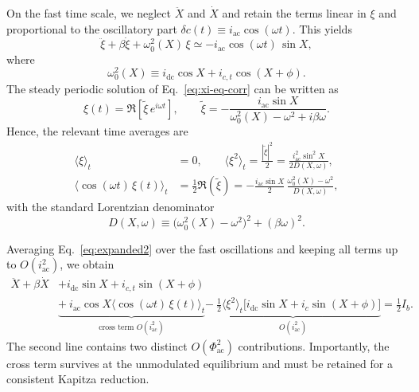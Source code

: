 \documentclass[prl,twocolumn,superscriptaddress,showpacs,nofootinbib]{revtex4-2}
\begin{document}
On the fast time scale, we neglect $\ddot X$ and $\dot X$ and retain the terms
linear in $\xi$ and proportional to the oscillatory part
$\delta c(t)\equiv i_{\mathrm{ac}}\cos(\omega t)$. This yields
\begin{equation}
\ddot \xi + \beta \dot \xi + \omega_0^2(X)\,\xi
\simeq
-i_{\mathrm{ac}}\cos(\omega t)\,\sin X,
\label{eq:xi-eq-corr}
\end{equation}
where
\begin{equation}
\omega_0^2(X)\equiv i_{\mathrm{dc}}\cos X + i_{c,t}\cos(X+\phi).
\label{eq:omega0}
\end{equation}
The steady periodic solution of Eq.~\eqref{eq:xi-eq-corr} can be written as
\begin{equation}
\xi(t)=\Re\!\left[\tilde\xi\,e^{i\omega t}\right],
\qquad
\tilde\xi=
-\frac{i_{\mathrm{ac}}\sin X}{\omega_0^2(X)-\omega^2+i\beta\omega}.
\label{eq:xi-sol-corr}
\end{equation}
Hence, the relevant time averages are
\begin{align}
\langle \xi\rangle_t &= 0,
\qquad
\langle \xi^2\rangle_t = \frac{|\tilde\xi|^2}{2}
=
\frac{i_{\mathrm{ac}}^2\sin^2 X}{2D(X,\omega)},
\label{eq:xi2-corr}
\\
\Big\langle \cos(\omega t)\,\xi(t)\Big\rangle_t
&=\frac{1}{2}\Re(\tilde\xi)
=
-\frac{i_{\mathrm{ac}}\sin X}{2}\,
\frac{\omega_0^2(X)-\omega^2}{D(X,\omega)},
\label{eq:cosxi-corr}
\end{align}
with the standard Lorentzian denominator
\begin{equation}
D(X,\omega)\equiv \big(\omega_0^2(X)-\omega^2\big)^2+(\beta\omega)^2.
\label{eq:Ddef}
\end{equation}

Averaging Eq.~\eqref{eq:expanded2} over the fast oscillations and keeping all
terms up to $O(i_{\mathrm{ac}}^2)$, we obtain
\begin{align}
\ddot X + \beta \dot X
&+ i_{\mathrm{dc}}\sin X + i_{c,t}\sin(X+\phi)
\nonumber\\
&\underbrace{+\ i_{\mathrm{ac}}\cos X\Big\langle \cos(\omega t)\,\xi(t)\Big\rangle_t}_{\text{cross term }O(i_{\mathrm{ac}}^2)}
\underbrace{-\ \frac{1}{2}\langle\xi^2\rangle_t\Big[i_{\mathrm{dc}}\sin X+i_c\sin(X+\phi)\Big]}_{O(i_{\mathrm{ac}}^2)}
=\frac{1}{2}I_b.
\label{eq:slow-corr}
\end{align}
The second line contains two distinct $O(\Phi_{\mathrm{ac}}^2)$ contributions. Importantly, the cross term survives at the unmodulated equilibrium and must be retained for a consistent Kapitza reduction.
\end{document}
